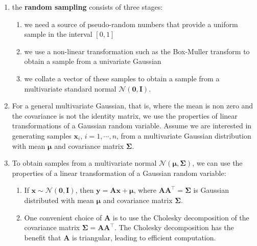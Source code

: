 \begin{enumerate}
    \item the \textbf{random sampling} consists of three stages:
    \hfill \cite{mfml/book/mml/Deisenroth-Faisal-Ong}
    \begin{enumerate}
        \item we need a source of pseudo-random numbers that provide a uniform sample in the interval $[0,1]$
        \hfill \cite{mfml/book/mml/Deisenroth-Faisal-Ong}
        
        \item we use a non-linear transformation such as the Box-Muller transform to obtain a sample from a univariate Gaussian
        \hfill \cite{mfml/book/mml/Deisenroth-Faisal-Ong}
        
        \item we collate a vector of these samples to obtain a sample from a multivariate standard normal $\mathcal{N} (\bm{0}, \bm{I})$.
        \hfill \cite{mfml/book/mml/Deisenroth-Faisal-Ong}
    \end{enumerate}

    \item For a general multivariate Gaussian, that is, where the mean is non zero and the covariance is not the identity matrix, we use the properties of linear transformations of a Gaussian random variable. 
    Assume we are interested in generating samples $\bm{x}_i$, $i = 1, \cdots , n$, from a multivariate Gaussian distribution with mean $\bm{\mu}$ and covariance matrix $\bm{\Sigma}$.
    \hfill \cite{mfml/book/mml/Deisenroth-Faisal-Ong}

    \item To obtain samples from a multivariate normal $\mathcal{N} (\bm{\mu} , \bm{\Sigma} )$, we can use the properties of a linear transformation of a Gaussian random variable:
    \hfill \cite{mfml/book/mml/Deisenroth-Faisal-Ong}
    \begin{enumerate}
        \item If $\bm{x} \sim \mathcal{N} (\bm{0}, \bm{I})$, then $\bm{y} = \bm{Ax} + \bm{\mu} $, where $\bm{AA}^\top  = \bm{\Sigma} $ is Gaussian distributed with mean $\bm{\mu} $ and covariance matrix $\bm{\Sigma} $. 
        \hfill \cite{mfml/book/mml/Deisenroth-Faisal-Ong}
        
        \item One convenient choice of $\bm{A}$ is to use the Cholesky decomposition of the covariance matrix $\bm{\Sigma}  = \bm{AA}^\top $. 
        The Cholesky decomposition has the benefit that $\bm{A}$ is triangular, leading to efficient computation.
        \hfill \cite{mfml/book/mml/Deisenroth-Faisal-Ong}
    \end{enumerate}
\end{enumerate}










